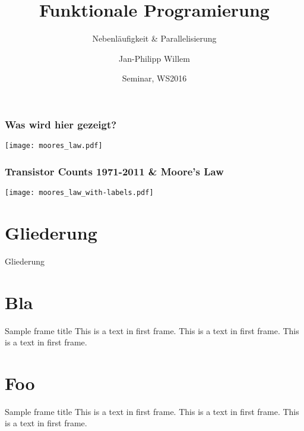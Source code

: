 \documentclass{beamer}
\title{Funktionale \break Programierung}
\subtitle{Nebenläufigkeit \& Parallelisierung}
\author{Jan-Philipp Willem}
\institute{
  Hochschule Mannheim\\
  Fakultät für Informatik\\
  Prof. Dr. Sandro Leuchter
}
\date{Seminar, WS2016}
\begin{document}
\begin{frame}
  \frametitle{Was wird hier gezeigt?}
  \centering
  \texttt{[image: moores\_law.pdf]}
\end{frame}
 
\begin{frame}
  \frametitle{Transistor Counts 1971-2011 \& Moore's Law}
  \centering
  \texttt{[image: moores\_law\_with-labels.pdf]}
\end{frame}

\maketitle

\section*{Gliederung}
\begin{frame}{Gliederung}
  \tableofcontents[hideallsubsections]
\end{frame}



\section[Bla]{Bla}
\begin{frame}{Sample frame title}
\setcounter{framenumber}{1}
  This is a text in first frame. This is a text in first frame. This is a text in first frame.
\end{frame}

\section[Foo]{Foo}
\begin{frame}{Sample frame title}
  This is a text in first frame. This is a text in first frame. This is a text in first frame.
\end{frame}
\end{document}
